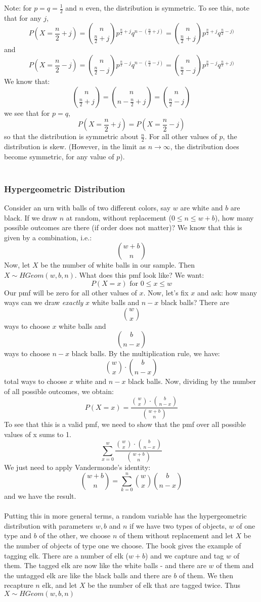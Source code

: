 \documentclass[12pt]{article} %
\begin{document}
Note: for $p=q=\frac12$ and $n$ even, the distribution is symmetric. To see this, note that for any $j$,
$$P(X = \frac{n}2+j) = {n\choose{\frac{n}2+j}} p^{\frac{n}2+j}q^{n-(\frac{n}2+j)} = {n\choose{\frac{n}2+j}} p^{\frac{n}2+j}q^{\frac{n}2-j)}$$
and
$$P(X = \frac{n}2-j) = {n\choose{\frac{n}2-j}} p^{\frac{n}2-j}q^{n-(\frac{n}2-j)} = {n\choose{\frac{n}2-j}} p^{\frac{n}2-j}q^{\frac{n}2+j)}$$
We know that:
$${n\choose{\frac{n}2+j}} = {n\choose{n-\frac{n}2+j}} = {n\choose{\frac{n}2-j}}$$
we see that for $p=q$,
$$P(X=\frac{n}2+j) = P(X=\frac{n}2-j)$$
so that the distribution is symmetric about $\frac{n}2$. For all other values of $p$, the distribution is skew. (However, in the limit as $n\rightarrow\infty$, the distribution does become symmetric, for any value of $p$).\\\\
\subsubsection{Hypergeometric Distribution}
Consider an urn with balls of two different colors, say $w$ are white and $b$ are black. If we draw $n$ at random, without replacement ($0\leq n\leq w+b$), how many possible outcomes are there (if order does not matter)? We know that this is given by a combination, i.e.:
$${{w+b}\choose n}$$
Now, let $X$ be the number of white balls in our sample. Then $X\sim HGeom(w,b,n)$. What does this pmf look like? We want:
$$P(X=x) \textrm{ for } 0\leq x\leq w$$
Our pmf will be zero for all other values of $x$. Now, let's fix $x$ and ask: how many ways can we draw \emph{exactly} $x$ white balls and $n-x$ black balls? There are
$${w\choose{x}}$$
ways to choose $x$ white balls and
$${b\choose{n-x}}$$
ways to choose $n-x$ black balls. By the multiplication rule, we have:
$${w\choose{x}}\cdot{b\choose{n-x}}$$
total ways to choose $x$ white and $n-x$ black balls. Now, dividing by the number of all possible outcomes, we obtain:
$$P(X=x) = \frac{{w\choose{x}}\cdot{b\choose{n-x}}}{{{w+b}\choose{n}}}$$
To see that this is a valid pmf, we need to show that the pmf over all possible values of x sums to 1.
$$\sum_{x=0}^{w}\frac{{w\choose{x}}\cdot{b\choose{n-x}}}{{{w+b}\choose{n}}}$$
We just need to apply Vandermonde's identity:
$${w+b \choose n}=\sum_{k=0}^n{w \choose x}{b \choose n-x}$$
and we have the result.\\\\
Putting this in more general terms, a random variable has the hypergeometric distribution with parameters $w,b$ and $n$ if we have two types of objects, $w$ of one type and $b$ of the other, we choose $n$ of them without replacement and let $X$ be the number of objects of type one we choose. The book gives the example of tagging elk. There are a number of elk ($w+b$) and we capture and tag $w$ of them. The tagged elk are now like the white balls - and there are $w$ of them and the untagged elk are like the black balls and there are $b$ of them. We then recapture $n$ elk, and let $X$ be the number of elk that are tagged twice. Thus $X\sim HGeom(w,b,n)$\\\\
\end{document}

